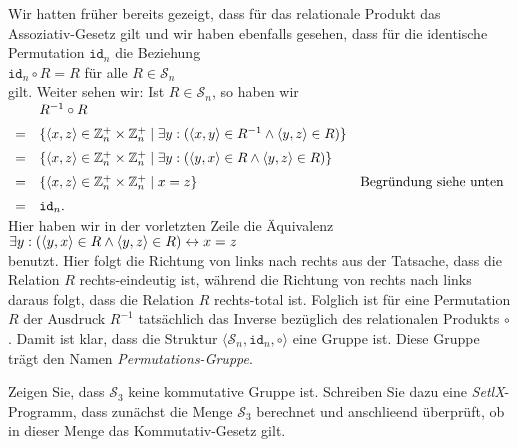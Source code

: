 \remark
Wir hatten fr\"{u}her bereits gezeigt, dass f\"{u}r das relationale Produkt das Assoziativ-Gesetz gilt und wir
haben ebenfalls gesehen, dass f\"{u}r die identische Permutation $\mathtt{id}_n$ die Beziehung
\\[0.2cm]
\hspace*{1.3cm}
$\mathtt{id}_n \circ R = R$ \quad f\"{u}r alle $R \in \mathcal{S}_n$
\\[0.2cm]
gilt.  Weiter sehen wir: Ist $R \in \mathcal{S}_n$, so haben wir
\\[0.2cm]
\hspace*{1.3cm}
$
\begin{array}[t]{cll}
   & R^{-1} \circ R \\[0.2cm]
 = & \{ \pair(x,z) \in \mathbb{Z}_n^+\times \mathbb{Z}_n^+ \mid \exists y: 
        (\pair(x,y) \in R^{-1} \wedge \pair(y,z) \in R )
     \} \\[0.2cm]
 = & \{ \pair(x,z) \in \mathbb{Z}_n^+ \times \mathbb{Z}_n^+ \mid 
        \exists y: (\pair(y,x) \in R \wedge \pair(y,z) \in R )
     \} 
   & \\[0.2cm]
 = & \{ \pair(x,z) \in \mathbb{Z}_n^+ \times \mathbb{Z}_n^+ \mid x = z \}
    & \mbox{Begr\"{u}ndung siehe unten}    \\[0.2cm]
 = & \mathtt{id}_n.
\end{array}
$
\\[0.2cm]
Hier haben wir in der vorletzten Zeile die \"{A}quivalenz
\\[0.2cm]
\hspace*{1.3cm}
$\exists y: (\pair(y,x) \in R \wedge \pair(y,z) \in R) \leftrightarrow x = z$
\\[0.2cm]
benutzt.  Hier folgt die Richtung von links nach rechts aus der Tatsache, dass die Relation $R$ rechts-eindeutig
ist, w\"{a}hrend die Richtung von rechts nach links daraus folgt, dass die Relation $R$ rechts-total ist.
Folglich ist f\"{u}r eine Permutation $R$ der Ausdruck $R^{-1}$ tats\"{a}chlich das Inverse bez\"{u}glich des
relationalen Produkts $\circ$.  Damit ist klar, dass die 
Struktur $\langle \mathcal{S}_n, \mathtt{id}_n, \circ \rangle$ eine Gruppe ist.
Diese Gruppe tr\"{a}gt den Namen \emph{\color{blue}Permutations-Gruppe}.
\eoxs


\exercise
Zeigen Sie, dass $\mathcal{S}_3$ keine kommutative Gruppe ist.  Schreiben Sie dazu eine \textsl{SetlX}-Programm,
dass zun\"{a}chst die Menge $\mathcal{S}_3$ berechnet und anschlie\3end \"{u}berpr\"{u}ft, ob in dieser Menge das
Kommutativ-Gesetz gilt.
\exend

